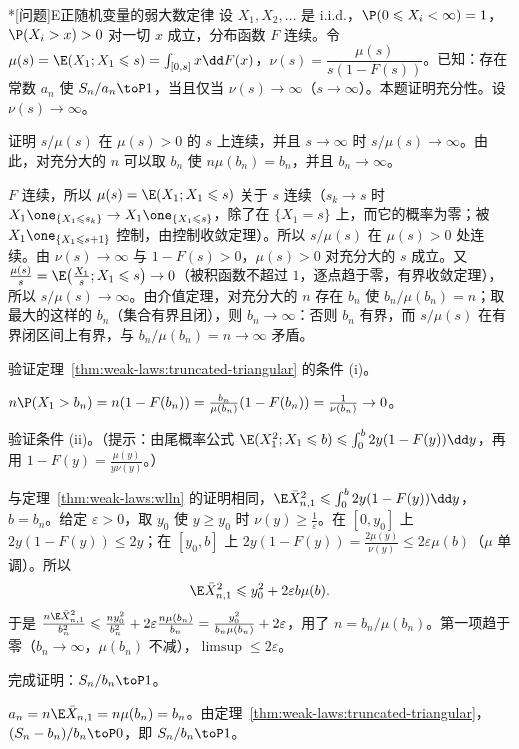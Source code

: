\begin{probleme}*[问题]{E}{正随机变量的弱大数定律}
设 $X_1,X_2,\dots$ 是 i.i.d.，$\P(0\leqslant X_i<\infty)=1$，$\P(X_i>x)>0$ 对一切 $x$ 成立，分布函数 $F$ 连续。令 $\mu(s)=\E(X_1;X_1\leqslant s)=\int_{[0,s]}x\dd F(x)$，$\nu(s)=\dfrac{\mu(s)}{s(1-F(s))}$。已知：存在常数 $a_n$ 使 $S_n/a_n\toP1$，当且仅当 $\nu(s)\to\infty$（$s\to\infty$）。本题证明充分性。设 $\nu(s)\to\infty$。
\begin{questions}
\item 证明 $s/\mu(s)$ 在 $\mu(s)>0$ 的 $s$ 上连续，并且 $s\to\infty$ 时 $s/\mu(s)\to\infty$。由此，对充分大的 $n$ 可以取 $b_n$ 使 $n\mu(b_n)=b_n$，并且 $b_n\to\infty$。
\begin{solution}
$F$ 连续，所以 $\mu(s)=\E(X_1;X_1\leqslant s)$ 关于 $s$ 连续（$s_k\to s$ 时 $X_1\one_{\{X_1\leqslant s_k\}}\to X_1\one_{\{X_1\leqslant s\}}$，除了在 $\{X_1=s\}$ 上，而它的概率为零；被 $X_1\one_{\{X_1\leqslant s+1\}}$ 控制，由控制收敛定理）。所以 $s/\mu(s)$ 在 $\mu(s)>0$ 处连续。由 $\nu(s)\to\infty$ 与 $1-F(s)>0$，$\mu(s)>0$ 对充分大的 $s$ 成立。又 $\frac{\mu(s)}s=\E\bigl(\frac{X_1}s;X_1\leqslant s\bigr)\to0$（被积函数不超过 $1$，逐点趋于零，有界收敛定理），所以 $s/\mu(s)\to\infty$。由介值定理，对充分大的 $n$ 存在 $b_n$ 使 $b_n/\mu(b_n)=n$；取最大的这样的 $b_n$（集合有界且闭），则 $b_n\to\infty$：否则 $b_n$ 有界，而 $s/\mu(s)$ 在有界闭区间上有界，与 $b_n/\mu(b_n)=n\to\infty$ 矛盾。
\end{solution}
\item 验证定理~\ref{thm:weak-laws:truncated-triangular} 的条件 (i)。
\begin{solution}
$n\P(X_1>b_n)=n(1-F(b_n))=\frac{b_n}{\mu(b_n)}(1-F(b_n))=\frac1{\nu(b_n)}\to0$。
\end{solution}
\item 验证条件 (ii)。（提示：由尾概率公式 $\E(X_1^2;X_1\leqslant b)\leqslant\int_0^b2y(1-F(y))\dd y$，再用 $1-F(y)=\frac{\mu(y)}{y\nu(y)}$。）
\begin{solution}
与定理~\ref{thm:weak-laws:wlln} 的证明相同，$\E\bar X_{n,1}^2\leqslant\int_0^{b}2y(1-F(y))\dd y$，$b=b_n$。给定 $\varepsilon>0$，取 $y_0$ 使 $y\geqslant y_0$ 时 $\nu(y)\geqslant\frac1\varepsilon$。在 $[0,y_0]$ 上 $2y(1-F(y))\leqslant2y$；在 $[y_0,b]$ 上 $2y(1-F(y))=\frac{2\mu(y)}{\nu(y)}\leqslant2\varepsilon\mu(b)$（$\mu$ 单调）。所以
\[
\E\bar X_{n,1}^2\leqslant y_0^2+2\varepsilon b\mu(b).
\]
于是 $\frac{n\E\bar X_{n,1}^2}{b_n^2}\leqslant\frac{ny_0^2}{b_n^2}+2\varepsilon\frac{n\mu(b_n)}{b_n}=\frac{y_0^2}{b_n\mu(b_n)}+2\varepsilon$，用了 $n=b_n/\mu(b_n)$。第一项趋于零（$b_n\to\infty$，$\mu(b_n)$ 不减），$\limsup\leqslant2\varepsilon$。
\end{solution}
\item 完成证明：$S_n/b_n\toP1$。
\begin{solution}
$a_n=n\E\bar X_{n,1}=n\mu(b_n)=b_n$。由定理~\ref{thm:weak-laws:truncated-triangular}，$(S_n-b_n)/b_n\toP0$，即 $S_n/b_n\toP1$。


\end{solution}
\end{questions}
\end{probleme}
